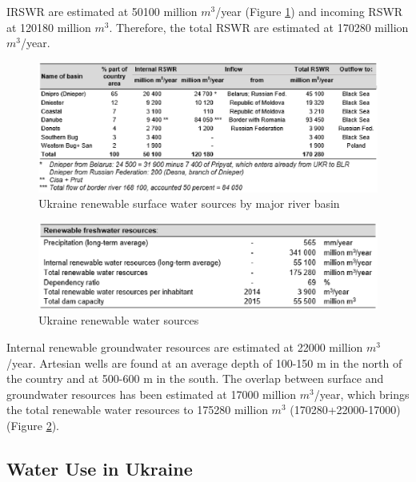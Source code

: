 IRSWR are estimated at 50100 million $m^3$/year (Figure \ref{table1}) and incoming RSWR at 120180 million $m^3$. Therefore, the total RSWR are estimated at 170280 million $m^3$/year.

\begin{figure}[!htbp]
\small
\centering
\includegraphics[width=12cm]{./picture/Table1.eps}
\caption{Ukraine renewable surface water sources by major river basin} \label{table1}
\end{figure}

\begin{figure}[!htbp]
\small
\centering
\includegraphics[width=12cm]{./picture/Table2.eps}
\caption{Ukraine renewable water sources} \label{table2}
\end{figure}

Internal renewable groundwater resources are estimated at 22000 million $m^3$/year. Artesian wells are found at an average depth of 100-150 m in the north of the country and at 500-600 m in the south. The overlap between surface and groundwater resources has been estimated at 17000 million $m^3$/year, which brings the total renewable water resources to 175280 million $m^3$ (170280+22000-17000) (Figure \ref{table2}).

\subsection{Water Use in Ukraine}

